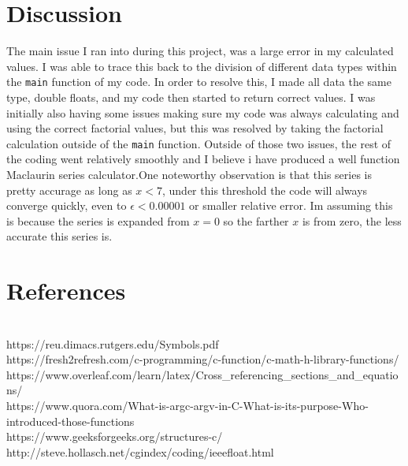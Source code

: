 \documentclass[11pt]{report}
\newcommand{\code}[1]{\colorbox{light-gray}{\texttt{#1}}}
\begin{document}
\section{Discussion}
The main issue I ran into during this project, was a large error in my calculated values. I was able to trace this back to the division of different data types within the \code{main} function of my code. In order to resolve this, I made all data the same type, double floats, and my code then started to return correct values. I was initially also having some issues making sure my code was always calculating and using the correct factorial values, but this was resolved by taking the factorial calculation outside of the \code{main} function. Outside of those two issues, the rest of the coding went relatively smoothly and I believe i have produced a well function Maclaurin series calculator.One noteworthy observation is that this series is pretty accurage as long as $x < 7$, under this threshold the code will always converge quickly, even to $\epsilon < 0.00001$ or smaller relative error. Im assuming this is because the series is expanded from $x=0$ so the farther $x$ is from zero, the less accurate this series is.
\newpage
\section{References}
\\ https://reu.dimacs.rutgers.edu/Symbols.pdf
\\ https://fresh2refresh.com/c-programming/c-function/c-math-h-library-functions/
\\ https://www.overleaf.com/learn/latex/Cross\_referencing\_sections\_and\_equations/
\\ https://www.quora.com/What-is-argc-argv-in-C-What-is-its-purpose-Who-introduced-those-functions
\\ https://www.geeksforgeeks.org/structures-c/
\\ http://steve.hollasch.net/cgindex/coding/ieeefloat.html
\end{document}

